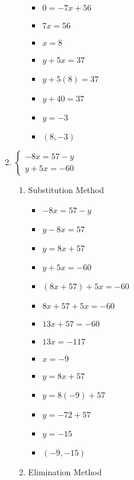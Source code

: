 \documentclass{article}
\begin{document}
\begin{enumerate}
\begin{enumerate}
\begin{itemize}
    \item $0=-7x+56$
    \item $7x=56$
    \item $x=8$
    \item $y+5x=37$
    \item $y+5(8)=37$
    \item $y+40=37$
    \item $y=-3$
    \item $(8,-3)$
    \end{itemize}
  \end{enumerate}
\item $\left\{ \begin{array}{l}
      -8x=57-y \\
      y+5x=-60 \end{array} \right.$
  \begin{enumerate}
  \item Substitution Method
    \begin{itemize}
    \item $-8x=57-y$
    \item $y-8x=57$
    \item $y=8x+57$
    \item $y+5x=-60$
    \item $(8x+57)+5x=-60$
    \item $8x+57+5x=-60$
    \item $13x+57=-60$
    \item $13x=-117$
    \item $x=-9$
    \item $y=8x+57$
    \item $y=8(-9)+57$
    \item $y=-72+57$
    \item $y=-15$
    \item $(-9,-15)$
    \end{itemize}
  \item Elimination Method
\end{enumerate}
\end{enumerate}
\end{document}
